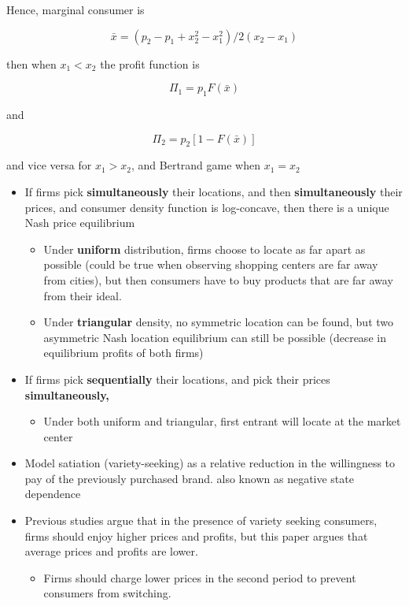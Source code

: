 \documentclass[
]{book}
\providecommand{\tightlist}{%
  \setlength{\itemsep}{0pt}\setlength{\parskip}{0pt}}
\begin{document}
Hence, marginal consumer is

\[
\bar{x} = (p_2 - p_1 + x^2_2-x_1^2)/2(x_2-x_1)
\]

then when \(x_1 < x_2\) the profit function is

\[
\Pi_1 = p_1 F(\bar{x})
\]

and

\[
\Pi_2 = p_2[1-F(\bar{x})]
\]

and vice versa for \(x_1 >x_2\), and Bertrand game when \(x_1 = x_2\)

\begin{itemize}
\item
  If firms pick \textbf{simultaneously} their locations, and then \textbf{simultaneously} their prices, and consumer density function is log-concave, then there is a unique Nash price equilibrium

  \begin{itemize}
  \item
    Under \textbf{uniform} distribution, firms choose to locate as far apart as possible (could be true when observing shopping centers are far away from cities), but then consumers have to buy products that are far away from their ideal.
  \item
    Under \textbf{triangular} density, no symmetric location can be found, but two asymmetric Nash location equilibrium can still be possible (decrease in equilibrium profits of both firms)
  \end{itemize}
\item
  If firms pick \textbf{sequentially} their locations, and pick their prices \textbf{simultaneously,}

  \begin{itemize}
  \tightlist
  \item
    Under both uniform and triangular, first entrant will locate at the market center
  \end{itemize}
\end{itemize}

\citet{sajeesh2010}

\begin{itemize}
\item
  Model satiation (variety-seeking) as a relative reduction in the willingness to pay of the previously purchased brand. also known as negative state dependence
\item
  Previous studies argue that in the presence of variety seeking consumers, firms should enjoy higher prices and profits, but this paper argues that average prices and profits are lower.

  \begin{itemize}
  \tightlist
  \item
    Firms should charge lower prices in the second period to prevent consumers from switching.
  \end{itemize}
\end{itemize}
\end{document}
